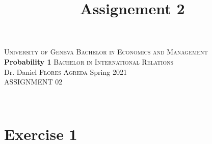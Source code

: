 \documentclass[12pt,thmsa]{article}\usepackage[]{graphicx}\usepackage[]{color}
\title{Assignement 2}
\begin{document}
\noindent \textsc{University of Geneva}     \hfill \textsc{Bachelor in Economics and Management} \\
\textbf{Probability 1}                      \hfill \textsc{Bachelor in International Relations} \\
Dr. Daniel \textsc{Flores Agreda}                 \hfill Spring 2021  \\
ASSIGNMENT 02                               \hfill



\noindent
\makebox[\linewidth]{\rule{\textwidth}{0.4pt}}\\[1.5ex]

\section*{Exercise 1}
\end{document}

